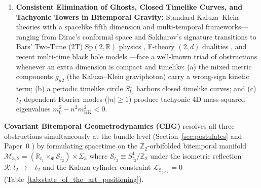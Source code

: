 \documentclass[11pt,a4paper]{article}
\theoremstyle{definition}
\theoremstyle{remark}
\begin{document}
\begin{enumerate}
  \item \textbf{Consistent Elimination of Ghosts, Closed Timelike Curves, and Tachyonic Towers in Bitemporal Gravity:} Standard Kaluza--Klein theories with a spacelike fifth dimension \cite{Kaluza1921,Klein1926,OverduinWesson1997} and multi-temporal frameworks---ranging from Dirac's conformal space \cite{Dirac1936} and Sakharov's signature transitions \cite{Sakharov1984} to Bars' Two-Time (2T) $\text{Sp}(2,\mathbb{R})$ physics \cite{Bars1998,Bars2000,Bars2001,Bars2006,Bars2008,BarsTerning2010}, F-theory $(2,d)$ dualities \cite{Vafa1996,Hull1998,Duff1999}, and recent multi-time black hole models \cite{FosterMuller2010,Velev2012,Paiman2023,KakKafatos2025,Kletetschka2025,Davey2026}---face a well-known triad of obstructions whenever an extra dimension is compact and timelike: (a) the mixed metric components $g_{\mu 2}$ (the Kaluza--Klein graviphoton) carry a wrong-sign kinetic term; (b) a periodic timelike circle $S^1_{t_2}$ harbors closed timelike curves; and (c) $t_2$-dependent Fourier modes ($|n| \ge 1$) produce tachyonic 4D mass-squared eigenvalues $m_0^2 - n^2 m_{\text{KK}}^2 < 0$.
\end{enumerate}

\textbf{Covariant Bitemporal Geometrodynamics (CBG)} resolves all three obstructions simultaneously at the bundle level (Section~\ref{sec:postulates} and Paper~0 \cite{JV_Paper0}) by formulating spacetime on the $\mathbb{Z}_2$-orbifolded bitemporal manifold $\mathcal{M}_{3,2} = (\mathbb{R}_{t_1} \times_{\Phi} \mathcal{S}_{t_2}) \times \Sigma_3$ where $\mathcal{S}_{t_2} \equiv S^1_{t_2}/\mathbb{Z}_2$ under the isometric reflection $\mathcal{R}: t_2 \mapsto -t_2$ and the Kaluza cylinder constraint $\mathcal{L}_{\xi_{(2)}} = 0$ (Table~\ref{tab:state_of_the_art_positioning}).
\end{document}
